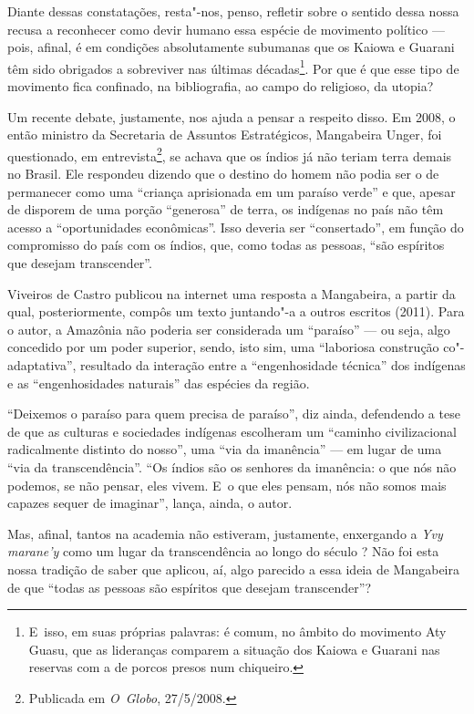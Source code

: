 Diante dessas constatações, resta"-nos, penso, refletir sobre o sentido
dessa nossa recusa a reconhecer como devir humano essa espécie de
movimento político --- pois, afinal, é em condições absolutamente
subumanas que os Kaiowa e Guarani têm sido obrigados a sobreviver nas
últimas décadas\footnote{E~isso, em suas próprias palavras: é comum, no
âmbito do movimento Aty Guasu, que as lideranças comparem a situação
dos Kaiowa e Guarani nas reservas com a de porcos presos num
chiqueiro.}. Por que é que esse tipo de movimento fica confinado, na
bibliografia, ao campo do religioso, da utopia?

Um recente debate, justamente, nos ajuda a pensar a respeito disso. Em
2008, o então ministro da Secretaria de Assuntos Estratégicos,
Mangabeira Unger, foi questionado, em entrevista\footnote{Publicada em
\emph{O~Globo}, 27/5/2008.}, se achava que os índios já não teriam terra
demais no Brasil. Ele respondeu dizendo que o destino do homem não
podia ser o de permanecer como uma ``criança aprisionada em um paraíso
verde'' e que, apesar de disporem de uma porção ``generosa'' de terra, os
indígenas no país não têm acesso a ``oportunidades econômicas''. Isso
deveria ser ``consertado'', em função do compromisso do país com os
índios, que, como todas as pessoas, ``são espíritos que desejam
transcender''.

Viveiros de Castro publicou na internet uma resposta a Mangabeira, a
partir da qual, posteriormente, compôs um texto juntando"-a a outros
escritos (2011). Para o autor, a Amazônia não poderia ser considerada
um ``paraíso'' --- ou seja, algo concedido por um poder superior, sendo,
isto sim, uma ``laboriosa construção co"-adaptativa'', resultado da
interação entre a ``engenhosidade técnica'' dos indígenas e as
``engenhosidades naturais'' das espécies da região. 

``Deixemos o paraíso para quem precisa de paraíso'', diz ainda, defendendo
a tese de que as culturas e sociedades indígenas escolheram um ``caminho
civilizacional radicalmente distinto do nosso'', uma ``via da imanência''
--- em lugar de uma ``via da transcendência''. ``Os índios são os senhores
da imanência: o que nós não podemos, se não pensar, eles vivem. E~o que
eles pensam, nós não somos mais capazes sequer de imaginar'', lança,
ainda, o autor.

Mas, afinal, tantos na academia não estiveram, justamente, enxergando a
\emph{Yvy marane’y} como um lugar da transcendência ao longo do século ? Não
foi esta nossa tradição de saber que aplicou, aí, algo parecido a essa
ideia de Mangabeira de que ``todas as pessoas são espíritos que desejam
transcender''?


